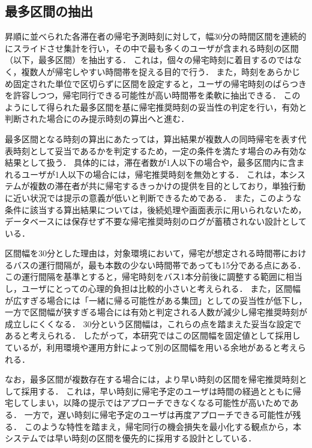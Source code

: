 \subsection{最多区間の抽出}
昇順に並べられた各滞在者の帰宅予測時刻に対して，幅30分の時間区間を連続的にスライドさせ集計を行い，その中で最も多くのユーザが含まれる時刻の区間（以下，最多区間）を抽出する．
これは，個々の帰宅時刻に着目するのではなく，複数人が帰宅しやすい時間帯を捉える目的で行う．
また，時刻をあらかじめ固定された単位で区切らずに区間を設定すると，ユーザの帰宅時刻のばらつきを許容しつつ，帰宅同行できる可能性が高い時間帯を柔軟に抽出できる．
このようにして得られた最多区間を基に帰宅推奨時刻の妥当性の判定を行い，有効と判断された場合にのみ提示時刻の算出へと進む．


最多区間となる時刻の算出にあたっては，算出結果が複数人の同時帰宅を表す代表時刻として妥当であるかを判定するため，一定の条件を満たす場合のみ有効な結果として扱う．
具体的には，滞在者数が1人以下の場合や，最多区間内に含まれるユーザが1人以下の場合には，帰宅推奨時刻を無効とする．
これは，本システムが複数の滞在者が共に帰宅するきっかけの提供を目的としており，単独行動に近い状況では提示の意義が低いと判断できるためである．
また，このような条件に該当する算出結果については，後続処理や画面表示に用いられないため，データベースには保存せず不要な帰宅推奨時刻のログが蓄積されない設計としている．


区間幅を30分とした理由は，対象環境において，帰宅が想定される時間帯におけるバスの運行間隔が，最も本数の少ない時間帯であっても15分である点にある．
この運行間隔を基準とすると，帰宅時刻をバス1本分前後に調整する範囲に相当し，ユーザにとっての心理的負担は比較的小さいと考えられる．
また，区間幅が広すぎる場合には「一緒に帰る可能性がある集団」としての妥当性が低下し，一方で区間幅が狭すぎる場合には有効と判定される人数が減少し帰宅推奨時刻が成立しにくくなる．
30分という区間幅は，これらの点を踏まえた妥当な設定であると考えられる．
したがって，本研究ではこの区間幅を固定値として採用しているが，利用環境や運用方針によって別の区間幅を用いる余地があると考えられる．


なお，最多区間が複数存在する場合には，より早い時刻の区間を帰宅推奨時刻として採用する．
これは，早い時刻に帰宅予定のユーザは時間の経過とともに帰宅してしまい，以降の提示ではアプローチできなくなる可能性が高いためである．
一方で，遅い時刻に帰宅予定のユーザは再度アプローチできる可能性が残る．
このような特性を踏まえ，帰宅同行の機会損失を最小化する観点から，本システムでは早い時刻の区間を優先的に採用する設計としている．